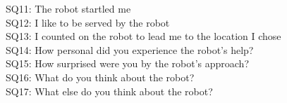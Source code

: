 \documentclass[paperwidth=160cm,paperheight=100cm,landscape,fontscale=0.3010]{baposter}
\begin{document}
\begin{poster}
{SQ11: The robot startled me\\ %
SQ12: I like to be served by the robot\\%
SQ13: I counted on the robot to lead me to the location I chose\\%
SQ14: How personal did you experience the robot's help?\\%
SQ15: How surprised were you by the robot's approach?\\%
SQ16: What do you think about the robot?\\%
SQ17: What else do you think about the robot?\\%

}
\end{poster}
\end{document}
